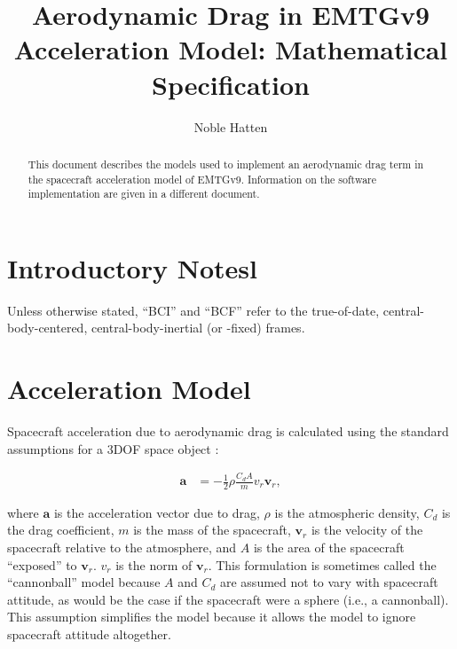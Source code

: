 \documentclass[]{article}
\title{Aerodynamic Drag in EMTGv9 Acceleration Model: Mathematical Specification}
\author{Noble Hatten}
\newcommand{\vb}[1]{\bm{#1}} %
\begin{document}
\maketitle

\begin{abstract}
	This document describes the models used to implement an aerodynamic drag term in the spacecraft acceleration model of EMTGv9. Information on the software implementation are given in a different document.

\end{abstract}

\tableofcontents

\printnomenclature

\section{Introductory Notesl}
\label{sec:introl}

Unless otherwise stated, ``BCI'' and ``BCF'' refer to the true-of-date, central-body-centered, central-body-inertial (or -fixed) frames.

\section{Acceleration Model}
\label{sec:acceleration_model}

Spacecraft acceleration due to aerodynamic drag is calculated using the standard assumptions for a 3DOF space object \cite{sme}:

\begin{align}
	\label{eq:drag_acceleration}
	\vb{a} &= - \frac{1}{2} \rho \frac{C_d A}{m} v_r \vb{v}_r,
\end{align}

\noindent where $\vb{a}$ is the acceleration vector due to drag, $\rho$ is the atmospheric density, $C_d$ is the drag coefficient, $m$ is the mass of the spacecraft, $\vb{v}_r$ is the velocity of the spacecraft relative to the atmosphere, and $A$ is the area of the spacecraft ``exposed'' to $\vb{v}_r$. $v_r$ is the norm of $\vb{v}_r$. This formulation is sometimes called the ``cannonball'' model because $A$ and $C_d$ are assumed not to vary with spacecraft attitude, as would be the case if the spacecraft were a sphere (i.e., a cannonball). This assumption simplifies the model because it allows the model to ignore spacecraft attitude altogether.


\end{document}
